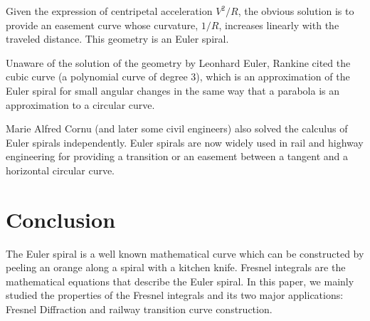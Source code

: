 \documentclass[12pt]{article}
\begin{document}
Given the expression of centripetal acceleration $V^{2} / R$, the obvious solution is to provide an easement curve whose curvature, $1/R$, increases linearly with the traveled distance. This geometry is an Euler spiral.

Unaware of the solution of the geometry by Leonhard Euler, Rankine cited the cubic curve (a polynomial curve of degree 3), which is an approximation of the Euler spiral for small angular changes in the same way that a parabola is an approximation to a circular curve.

Marie Alfred Cornu (and later some civil engineers) also solved the calculus of Euler spirals independently. Euler spirals are now widely used in rail and highway engineering for providing a transition or an easement between a tangent and a horizontal circular curve.



\section{Conclusion}
The Euler spiral is a well known mathematical curve which can be constructed by peeling an orange along a spiral with a kitchen knife. Fresnel integrals are the mathematical equations that describe the Euler spiral. In this paper, we mainly studied the properties of the Fresnel integrals and its two major applications: Fresnel Diffraction and railway transition curve construction.




\end{document}
